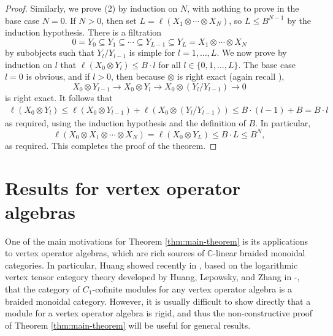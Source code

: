 \documentclass[11pt, reqno]{amsart}
\theoremstyle{definition}\newtheorem{defi}[thm]{Definition}
\theoremstyle{definition}\newtheorem{rem}[thm]{Remark}
\theoremstyle{definition}\newtheorem{exam}[thm]{Example}
\theoremstyle{definition}\newtheorem{assum}[thm]{Assumption}
\newcommand{\CC}{\mathbb{C}}
\begin{document}
\begin{proof}
Similarly, we prove (2) by induction on $N$, with nothing to prove in the base case $N=0$. If $N>0$, then set $L=\ell(X_1\otimes\cdots\otimes X_N)$, so $L\leq B^{N-1}$ by the induction hypothesis. There is a filtration
\begin{equation*}
0 = Y_0\subseteq Y_1\subseteq\cdots\subseteq Y_{L-1}\subseteq Y_L=X_1\otimes\cdots\otimes X_N
\end{equation*} 
by subobjects such that $Y_l/Y_{l-1}$ is simple for $l=1,\ldots, L$. We now prove by induction on $l$ that $\ell(X_0\otimes Y_l)\leq B\cdot l$ for all $l\in\lbrace 0, 1,\ldots, L\rbrace$. The base case $l=0$ is obvious, and if $l>0$, then because $\otimes$ is right exact (again recall \cite[Remark 1.1(iii)]{BD}),
\begin{equation*}
X_0\otimes Y_{l-1}\longrightarrow X_0\otimes Y_l\longrightarrow X_0\otimes(Y_l/Y_{l-1})\longrightarrow 0
\end{equation*}
is right exact. It follows that
\begin{align*}
\ell(X_0\otimes Y_l)\leq \ell(X_0\otimes Y_{l-1})+\ell(X_0\otimes(Y_l/Y_{l-1}))\leq B\cdot (l-1)+B = B\cdot l
\end{align*}
as required, using the induction hypothesis and the definition of $B$. In particular,
\begin{equation*}
\ell(X_0\otimes X_1\otimes\cdots\otimes X_N) =\ell(X_0\otimes Y_L)\leq B\cdot L\leq B^N,
\end{equation*}
as required. This completes the proof of the theorem.
\end{proof}

\section{Results for vertex operator algebras}\label{sec:VOA-app}

One of the main motivations for Theorem \ref{thm:main-theorem} is its applications to vertex operator algebras, which are rich sources of $\CC$-linear braided monoidal categories. In particular, Huang showed recently in \cite{Hu}, based on the logarithmic vertex tensor category theory developed by Huang, Lepowsky, and Zhang in \cite{HLZ1}-\cite{HLZ8}, that the category of $C_1$-cofinite modules for any vertex operator algebra is a braided monoidal category. However, it is usually difficult to show directly that a module for a vertex operator algebra is rigid, and thus the non-constructive proof of Theorem \ref{thm:main-theorem} will be useful for general results.
\end{document}
